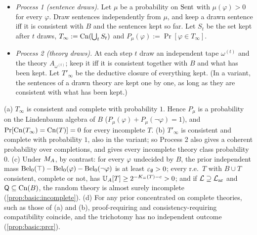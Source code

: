 \begin{itemize}[leftmargin=*]
\item \emph{Process 1 (sentence draws).} Let $\mu$ be a probability on $\mathrm{Sent}$ with $\mu(\varphi)>0$ for every $\varphi$. Draw sentences independently from $\mu$, and keep a drawn sentence iff it is consistent with $B$ and the sentences kept so far. Let $S_t$ be the set kept after $t$ draws, $T_\infty:=\mathrm{Cn}(\bigcup_tS_t)$ and $P_\mu(\varphi):=\Pr[\varphi\in T_\infty]$.
\item \emph{Process 2 (theory draws).} At each step $t$ draw an independent tape $\omega^{(t)}$ and the theory $A_{\omega^{(t)}}$; keep it iff it is consistent together with $B$ and what has been kept. Let $T'_\infty$ be the deductive closure of everything kept. (In a variant, the sentences of a drawn theory are kept one by one, as long as they are consistent with what has been kept.)
\end{itemize}

\begin{proposition}\label{prop:basic:demski}
(a) $T_\infty$ is consistent and complete with probability $1$. Hence $P_\mu$ is a probability on the Lindenbaum algebra of $B$ ($P_\mu(\varphi)+P_\mu(\neg\varphi)=1$), and $\Pr[\mathrm{Cn}(T_\infty)=\mathrm{Cn}(T)]=0$ for every incomplete $T$.
(b) $T'_\infty$ is consistent and complete with probability $1$, also in the variant; so Process 2 also gives a coherent probability over completions, and gives every incomplete theory class probability $0$.
(c) Under $M_{A}$, by contrast: for every $\varphi$ undecided by $B$, the prior independent mass $\mathrm{Bel}_0(\top)-\mathrm{Bel}_0(\varphi)-\mathrm{Bel}_0(\neg\varphi)$ is at least $\varepsilon_{\emptyset}>0$; every r.e.\ $T$ with $B\cup T$ consistent, complete or not, has $\mathbb{U}_{A}[T]\ge2^{-K_{\equiv}(T)-c}>0$; and if $\mathcal L\supseteq\mathcal{L}_{\mathrm{ar}}$ and $\mathsf{Q}\subseteq\mathrm{Cn}(B)$, the random theory is almost surely incomplete (\cref{prop:basic:incomplete}).
(d) For any prior concentrated on complete theories, such as those of (a) and (b), proof-requiring and consistency-requiring compatibility coincide, and the trichotomy has no independent outcome (\cref{prop:basic:prcr}).
\end{proposition}

